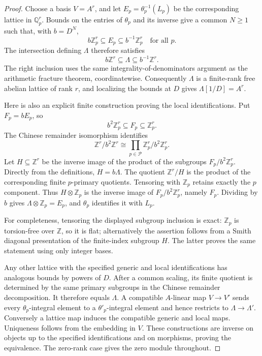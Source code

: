 \begin{proof}
Choose a basis $V=A^r$, and let $E_p=\theta_p^{-1}(L_p)$ be the corresponding lattice in $\mathbb Q_p^r$. Bounds on the entries of $\theta_p$ and its inverse give a common $N\geq1$ such that, with $b=D^N$,
\[
 b\mathbb Z_p^r\subseteq E_p\subseteq b^{-1}\mathbb Z_p^r
 \quad\text{for all }p.
\]
The intersection defining $\Lambda$ therefore satisfies
\[
 b\mathbb Z^r\subseteq\Lambda\subseteq b^{-1}\mathbb Z^r.
\]
The right inclusion uses the same integrality-of-denominators argument as the arithmetic fracture theorem, coordinatewise. Consequently $\Lambda$ is a finite-rank free abelian lattice of rank $r$, and localizing the bounds at $D$ gives $\Lambda[1/D]=A^r$.

Here is also an explicit finite construction proving the local identifications. Put $F_p=bE_p$, so
\[
 b^2\mathbb Z_p^r\subseteq F_p\subseteq\mathbb Z_p^r.
\]
The Chinese remainder isomorphism identifies
\[
 \mathbb Z^r/b^2\mathbb Z^r\cong
 \prod_{p\in\mathcal P}\mathbb Z_p^r/b^2\mathbb Z_p^r.
\]
Let $H\subseteq\mathbb Z^r$ be the inverse image of the product of the subgroups $F_p/b^2\mathbb Z_p^r$. Directly from the definitions, $H=b\Lambda$. The quotient $\mathbb Z^r/H$ is the product of the corresponding finite $p$-primary quotients. Tensoring with $\mathbb Z_p$ retains exactly the $p$ component. Thus $H\otimes\mathbb Z_p$ is the inverse image of $F_p/b^2\mathbb Z_p^r$, namely $F_p$. Dividing by $b$ gives $\Lambda\otimes\mathbb Z_p=E_p$, and $\theta_p$ identifies it with $L_p$.

For completeness, tensoring the displayed subgroup inclusion is exact: $\mathbb Z_p$ is torsion-free over $\mathbb Z$, so it is flat; alternatively the assertion follows from a Smith diagonal presentation of the finite-index subgroup $H$. The latter proves the same statement using only integer bases.

Any other lattice with the specified generic and local identifications has analogous bounds by powers of $D$. After a common scaling, its finite quotient is determined by the same primary subgroups in the Chinese remainder decomposition. It therefore equals $\Lambda$. A compatible $A$-linear map $V\to V'$ sends every $\theta_p$-integral element to a $\theta'_p$-integral element and hence restricts to $\Lambda\to\Lambda'$. Conversely a lattice map induces the compatible generic and local maps. Uniqueness follows from the embedding in $V$. These constructions are inverse on objects up to the specified identifications and on morphisms, proving the equivalence. The zero-rank case gives the zero module throughout.
\end{proof}

